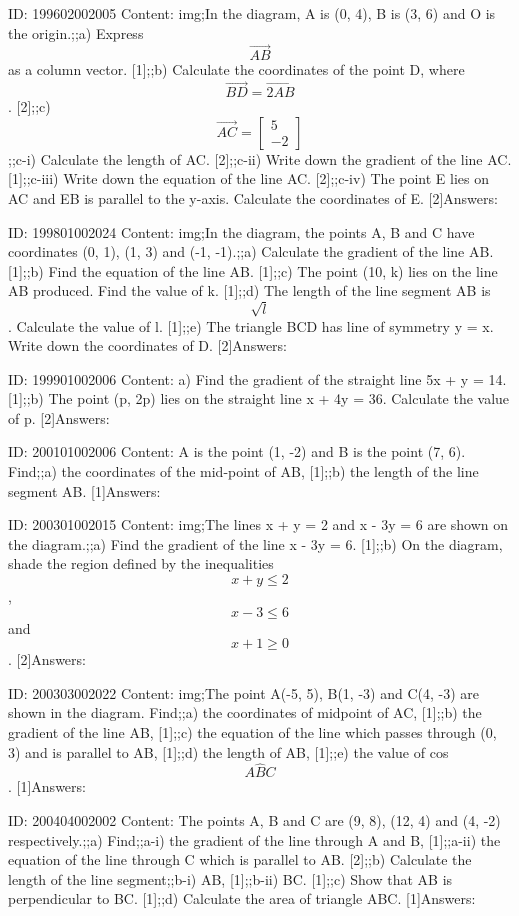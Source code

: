\documentclass{article}
\begin{document}
ID: 199602002005
Content:
img;In the diagram, A is (0, 4), B is (3, 6) and O is the origin.;;a) Express $$\vec{AB}$$ as a column vector. [1];;b) Calculate the coordinates of the point D, where $$\vec{BD}  = \vec{2AB}$$. [2];;c) $$\vec{AC} = \begin{bmatrix}5\\-2\end{bmatrix}$$;;c-i) Calculate the length of AC. [2];;c-ii) Write down the gradient of the line AC. [1];;c-iii) Write down the equation of the line AC. [2];;c-iv) The point E lies on AC and EB is parallel to the y-axis. Calculate the coordinates of E. [2]Answers:

ID: 199801002024
Content:
img;In the diagram, the points A, B and C have coordinates (0, 1), (1, 3) and (-1, -1).;;a) Calculate the gradient of the line AB. [1];;b) Find the equation of the line AB. [1];;c) The point (10, k) lies on the line AB produced. Find the value of k. [1];;d) The length of the line segment AB is $$\sqrt{l}$$. Calculate the value of l. [1];;e) The triangle BCD has line of symmetry y = x. Write down the coordinates of D. [2]Answers:

ID: 199901002006
Content:
a) Find the gradient of the straight line 5x + y = 14. [1];;b) The point (p, 2p) lies on the straight line x + 4y = 36. Calculate the value of p. [2]Answers:

ID: 200101002006
Content:
A is the point (1, -2) and B is the point (7, 6). Find;;a) the coordinates of the mid-point of AB, [1];;b) the length of the line segment AB. [1]Answers:

ID: 200301002015
Content:
img;The lines x + y = 2 and x - 3y = 6 are shown on the diagram.;;a) Find the gradient of the line x - 3y = 6. [1];;b) On the diagram, shade the region defined by the inequalities $$x+y\leq2$$, $$x-3\leq6$$ and $$x+1 \geq 0$$. [2]Answers:

ID: 200303002022
Content:
img;The point A(-5, 5), B(1, -3) and C(4, -3) are shown in the diagram. Find;;a) the coordinates of midpoint of AC,   [1];;b) the gradient of the line AB,   [1];;c) the equation of the line which passes through (0, 3) and is parallel to AB,   [1];;d) the length of AB,   [1];;e) the value of cos $$A \hat BC$$.   [1]Answers:

ID: 200404002002
Content:
The points A, B and C are (9, 8), (12, 4) and (4, -2) respectively.;;a) Find;;a-i) the gradient of the line through A and B, [1];;a-ii) the equation of the line through C which is parallel to AB. [2];;b) Calculate the length of the line segment;;b-i) AB, [1];;b-ii) BC. [1];;c) Show that AB is perpendicular to BC. [1];;d) Calculate the area of triangle ABC. [1]Answers:
\end{document}

